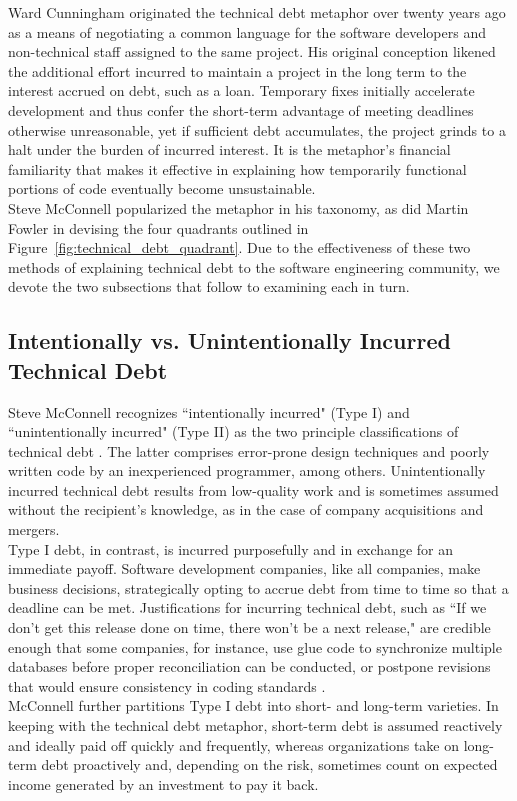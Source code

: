 Ward Cunningham \cite{cunningham1993wycash} originated the technical debt metaphor over twenty years ago as a means of negotiating a common language for the software developers and non-technical staff assigned to the same project. His original conception likened the additional effort incurred to maintain a project in the long term to the interest accrued on debt, such as a loan. Temporary fixes initially accelerate development and thus confer the short-term advantage of meeting deadlines otherwise unreasonable, yet if sufficient debt accumulates, the project grinds to a halt under the burden of incurred interest. It is the metaphor's financial familiarity that makes it effective in explaining how temporarily functional portions of code eventually become unsustainable.\\

Steve McConnell \cite{mcconnell} popularized the metaphor in his taxonomy, as did Martin Fowler \cite{fowler} in devising the four quadrants outlined in Figure~\ref{fig:technical_debt_quadrant}. Due to the effectiveness of these two methods of explaining technical debt to the software engineering community, we devote the two subsections that follow to examining each in turn.


\subsection{Intentionally vs. Unintentionally Incurred Technical Debt}

Steve McConnell recognizes ``intentionally incurred" (Type I) and ``unintentionally incurred" (Type II) as the two principle classifications of technical debt \cite{mcconnell}.  The latter comprises error-prone design techniques and poorly written code by an inexperienced programmer, among others.  Unintentionally incurred technical debt results from low-quality work and is sometimes assumed without the recipient's knowledge, as in the case of company acquisitions and mergers.\\
Type I debt, in contrast, is incurred purposefully and in exchange for an immediate payoff. Software development companies, like all companies, make business decisions, strategically opting to accrue debt from time to time so that a deadline can be met. Justifications for incurring technical debt, such as ``If we don't get this release done on time, there won't be a next release," are credible enough that some companies, for instance, use glue code to synchronize multiple databases before proper reconciliation can be conducted, or postpone revisions that would ensure consistency in coding standards \cite{mcconnell}.\\
McConnell further partitions Type I debt into short- and long-term varieties. In keeping with the technical debt metaphor, short-term debt is assumed reactively and ideally paid off quickly and frequently, whereas organizations take on long-term debt proactively and, depending on the risk, sometimes count on expected income generated by an investment to pay it back.


